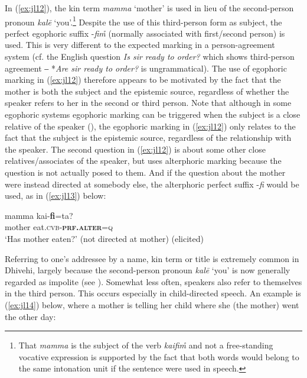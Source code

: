 \documentclass[output=paper]{langsci/langscibook}
\begin{document}
In (\ref{ex:jl12}), the kin term \textit{mamma} ‘mother’ is used in lieu of the second-person pronoun \textit{kalē} ‘you’.\footnote{That \textit{mamma} is the subject of the verb \textit{kaifim̊} and not a free-standing vocative expression is supported by the fact that both words would belong to the same intonation unit if the sentence were used in speech.} 
Despite the use of this third-person form as subject, the perfect egophoric suffix -\textit{fim̊} (normally associated with first/second person) is used. This is very different to the expected marking in a person-agreement system (cf. the English question \textit{Is sir ready to order?} which shows third-person agreement ‒ *\textit{Are sir ready to order?} is ungrammatical). The use of egophoric marking in (\ref{ex:jl12}) therefore appears to be motivated by the fact that the mother is both the subject and the epistemic source, regardless of whether the speaker refers to her in the second or third person. Note that although in some egophoric systems egophoric marking can be triggered when the subject is a close relative of the speaker (\citealt[33]{SanRoque2018}), the egophoric marking in (\ref{ex:jl12}) only relates to the fact that the subject is the epistemic source, regardless of the relationship with the speaker. The second question in (\ref{ex:jl12}) is about some other close relatives/associates of the speaker, but uses alterphoric marking because the question is not actually posed to them. And if the question about the mother were instead directed at somebody else, the alterphoric perfect suffix -\textit{fi} would be used, as in (\ref{ex:jl13}) below:

\begin{exe}
	\ex 	\label{ex:jl13}
	\gll mamma kai-\textbf{fi}=ta?\\
	mother eat.\textsc{cvb}-\textbf{\textsc{prf}.\textsc{alter}}=\textsc{q}\\
	\trans ‘Has mother eaten?’ (not directed at mother) (elicited)
\end{exe}

Referring to one’s addressee by a name, kin term or title is extremely common in Dhivehi, largely because the second-person pronoun \textit{kalē} ‘you’ is now generally regarded as impolite (see \citealt[70]{Gnanadesikan2017}). Somewhat less often, speakers also refer to themselves in the third person. This occurs especially in child-directed speech. An example is (\ref{ex:jl14}) below, where a mother is telling her child where she (the mother) went the other day:
\end{document}
